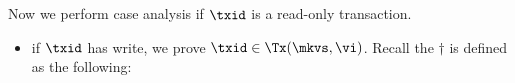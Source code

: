 \begin{itemize}
\begin{itemize}
    Now we perform case analysis if \( \txid \) is a read-only transaction.
    \begin{itemize}
        \item if \( \txid \) has write, we prove \( \txid \in \Tx(\mkvs, \vi)\).
        Recall the \( \dagger \) is defined as the following:

\end{itemize}
\end{itemize}
\end{itemize}
